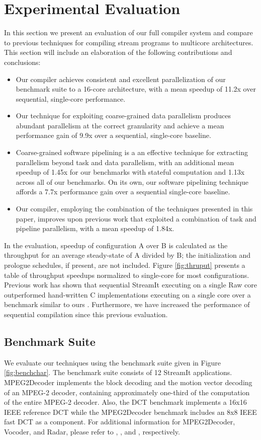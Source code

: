 \section{Experimental Evaluation}
\label{sec:results}
In this section we present an evaluation of our full compiler system
and compare to previous techniques for compiling stream programs to
multicore architectures.  This section will include an elaboration of
the following contributions and conclusions:

\begin{itemize}
\item Our compiler achieves consistent and excellent parallelization of our
benchmark suite to a 16-core architecture, with a mean speedup of 
11.2x over sequential, single-core performance.
\item Our technique for exploiting coarse-grained data parallelism
produces abundant parallelism at the correct granularity and achieve a
mean performance gain of 9.9x over a sequential, single-core
baseline.
\item Coarse-grained software pipelining is a
an effective technique for extracting parallelism beyond task and data
parallelism, with an additional mean speedup of 1.45x for
our benchmarks with stateful computation and 1.13x across all of our
benchmarks. On its own, our software pipelining technique affords a
7.7x performance gain over a sequential single-core baseline.
\item Our compiler, employing the combination of the techniques
presented in this paper, improves upon previous work that exploited a
combination of task and pipeline parallelism, with a mean speedup of
1.84x.
\end{itemize}

In the evaluation, speedup of configuration A over B is calculated as
the throughput for an average steady-state of A divided by B; the
initialization and prologue schedules, if present, are not
included. Figure \ref{fig:thruput} presents a table of throughput
speedups normalized to single-core for most configurations.  Previous
work has shown that sequential StreamIt executing on a single Raw core
outperformed hand-written C implementations executing on a single core
over a benchmark similar to ours \cite{raw_isca}. Furthermore, we have
increased the performance of sequential compilation since this
previous evaluation.

\subsection{Benchmark Suite}
We evaluate our techniques using the benchmark suite given in Figure
\ref{fig:benchchar}.   The benchmark suite consists of 12 StreamIt
applications. MPEG2Decoder implements the block decoding and the
motion vector decoding of an MPEG-2 decoder, containing approximately
one-third of the computation of the entire MPEG-2 decoder.  Also, the
DCT benchmark implements a 16x16 IEEE reference DCT while the
MPEG2Decoder benchmark includes an 8x8 IEEE fast DCT as a component.
For additional information for MPEG2Decoder, Vocoder, and Radar,
please refer to \cite{ipdps2006},
\cite{seneff80}, and \cite{pca}, respectively. 

